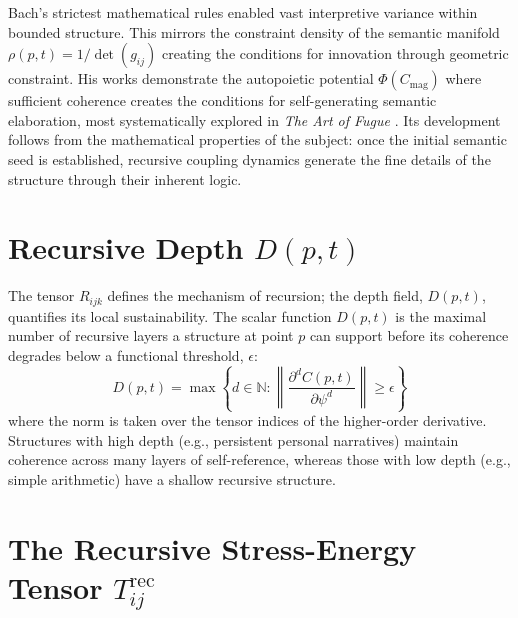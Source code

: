 Bach's strictest mathematical rules enabled vast interpretive variance within bounded structure. This mirrors the constraint density of the semantic manifold \(\rho(p,t) = 1/\det(g_{ij})\) creating the conditions for innovation through geometric constraint. His works demonstrate the autopoietic potential \(\Phi(C_{\text{mag}})\) where sufficient coherence creates the conditions for self-generating semantic elaboration, most systematically explored in \textit{The Art of Fugue} \autocite{Bach1751}. Its development follows from the mathematical properties of the subject: once the initial semantic seed is established, recursive coupling dynamics generate the fine details of the structure through their inherent logic.

\section{\texorpdfstring{Recursive Depth $D(p, t)$}{Recursive Depth D(p, t)}}

The tensor \(R_{ijk}\) defines the mechanism of recursion; the depth field, \(D(p, t)\), quantifies its local sustainability. The scalar function \(D(p,t)\) is the maximal number of recursive layers a structure at point \(p\) can support before its coherence degrades below a functional threshold, \(\epsilon\):
\begin{equation}
D(p, t) = \max \left\{ d \in \mathbb{N} : \left\| \frac{\partial^d C(p,t)}{\partial \psi^d} \right\| \geq \epsilon \right\}
\end{equation}
where the norm is taken over the tensor indices of the higher-order derivative. Structures with high depth (e.g., persistent personal narratives) maintain coherence across many layers of self-reference, whereas those with low depth (e.g., simple arithmetic) have a shallow recursive structure.

\section{\texorpdfstring{The Recursive Stress-Energy Tensor $T_{ij}^{\text{rec}}$}{The Recursive Stress-Energy Tensor Tij\_rec}}

